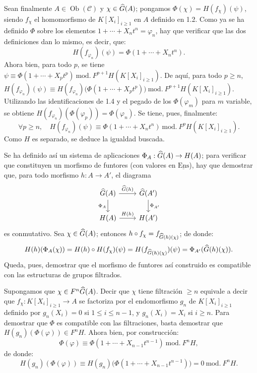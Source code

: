 Sean finalmente \(A\in\operatorname{Ob}(\mathcal C)\) y \(\chi\in\widehat G(A)\); pongamos \(\Phi(\chi)=H(f_\chi)(\psi)\), siendo \(f_\chi\) el homomorfismo de \(K[X_i]_{i\geq 1}\) en \(A\) definido en 1.2. Como ya se ha definido \(\Phi\) sobre los elementos \(1+\cdots+X_nt^n=\varphi_n\), hay que verificar que las dos definiciones dan lo mismo, es decir, que:
\[
  H(f_{\varphi_n})(\psi)=\Phi(1+\cdots+X_nt^n).
\]
Ahora bien, para todo \(p\), se tiene \(\psi\equiv \Phi(1+\cdots+X_pt^p)\ \mathrm{mod.}\ F^{p+1}H(K[X_i]_{i\geq 1})\). De aquí, para todo \(p\geq n\), \(H(f_{\varphi_n})(\psi)\equiv H(f_{\varphi_n})\bigl(\Phi(1+\cdots+X_pt^p)\bigr)\ \mathrm{mod.}\ F^{p+1}H(K[X_i]_{i\geq 1})\). Utilizando las identificaciones de 1.4 y el pegado de los \(\Phi(\varphi_m)\) para \(m\) variable, se obtiene \(H(f_{\varphi_n})(\Phi(\varphi_p))=\Phi(\varphi_n)\).
Se tiene, pues, finalmente:
\[
  \forall p\geq n,\quad
  H(f_{\varphi_n})(\psi)\equiv \Phi(1+\cdots+X_nt^n)
  \ \mathrm{mod.}\ F^pH(K[X_i]_{i\geq 1}).
\]
Como \(H\) es separado, se deduce la igualdad buscada.

Se ha definido así un sistema de aplicaciones \(\Phi_A:\widehat G(A)\to H(A)\); para verificar que constituyen un morfismo de funtores (con valores en \(\underline{\mathrm{Ens}}\)), hay que demostrar que, para todo morfismo \(h:A\to A'\), el diagrama
\[
\begin{tikzcd}
\Ghat(A) \arrow[r,"\Ghat(h)"] \arrow[d,"\Phi_A"'] &
\Ghat(A') \arrow[d,"\Phi_{A'}"]\\
H(A) \arrow[r,"H(h)"] & H(A')
\end{tikzcd}
\]
es conmutativo. Sea \(\chi\in\widehat G(A)\); entonces \(h\circ f_\chi=f_{\widehat G(h)(\chi)}\); de donde:
\[
  H(h)(\Phi_A(\chi))=H(h)\circ H(f_\chi)(\psi)
  =H(f_{\widehat G(h)(\chi)})(\psi)=\Phi_{A'}(\widehat G(h)(\chi)).
\]
Queda, pues, demostrar que el morfismo de funtores así construido es compatible con las estructuras de grupos filtrados.

Supongamos que \(\chi\in F^n\widehat G(A)\). Decir que \(\chi\) tiene filtración \(\geq n\) equivale a decir que \(f_\chi:K[X_i]_{i\geq 1}\to A\) se factoriza por el endomorfismo \(g_n\) de \(K[X_i]_{i\geq 1}\) definido por \(g_n(X_i)=0\) si \(1\leq i\leq n-1\), y \(g_n(X_i)=X_i\) si \(i\geq n\).
Para demostrar que \(\Phi\) es compatible con las filtraciones, basta demostrar que \(H(g_n)(\Phi(\varphi))\in F^nH\). Ahora bien, por construcción:
\[
  \Phi(\varphi)\equiv \Phi(1+\cdots+X_{n-1}t^{n-1})\ \mathrm{mod.}\ F^nH,
\]
de donde:
\[
  H(g_n)(\Phi(\varphi))
  \equiv H(g_n)\bigl(\Phi(1+\cdots+X_{n-1}t^{n-1})\bigr)
  =0\ \mathrm{mod.}\ F^nH.
\]

